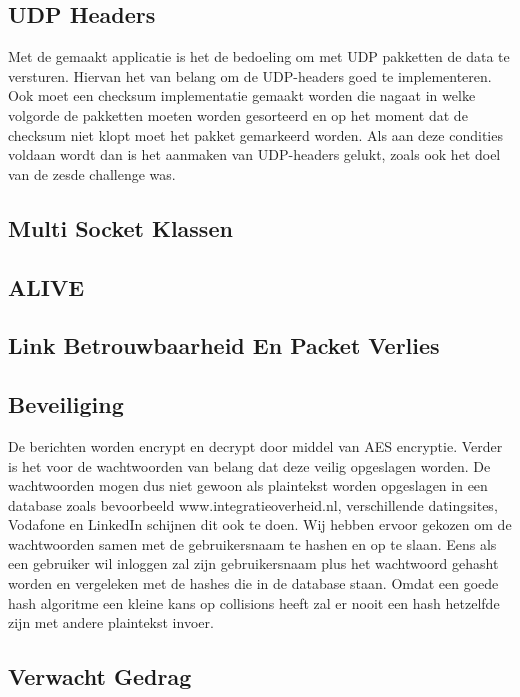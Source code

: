 \documentclass[12pt]{article}
\begin{document}
\subsection{UDP Headers}
Met de gemaakt applicatie is het de bedoeling om met UDP pakketten de data te versturen. Hiervan het van belang om de UDP-headers goed te implementeren. Ook moet een checksum implementatie gemaakt worden die nagaat in welke volgorde de pakketten moeten worden gesorteerd en op het moment dat de checksum niet klopt moet het pakket gemarkeerd worden. Als aan deze condities voldaan wordt dan is het aanmaken van UDP-headers gelukt, zoals ook het doel van de zesde challenge was. 

\subsection{Multi Socket Klassen}


\subsection{ALIVE}


\subsection{Link Betrouwbaarheid En Packet Verlies}


\subsection{Beveiliging}
De berichten worden encrypt en decrypt door middel van AES encryptie. Verder is het voor de wachtwoorden van belang dat deze veilig opgeslagen worden. De wachtwoorden mogen dus niet gewoon als plaintekst worden opgeslagen in een database zoals bevoorbeeld www.integratieoverheid.nl, verschillende datingsites, Vodafone en LinkedIn schijnen dit ook te doen. Wij hebben ervoor gekozen om de wachtwoorden samen met de gebruikersnaam te hashen en op te slaan. Eens als een gebruiker wil inloggen zal zijn gebruikersnaam plus het wachtwoord gehasht worden en vergeleken met de hashes die in de database staan. Omdat een goede hash algoritme een kleine kans op collisions heeft zal er nooit een hash hetzelfde zijn met andere plaintekst invoer.

\subsection{Verwacht Gedrag}
\end{document}

